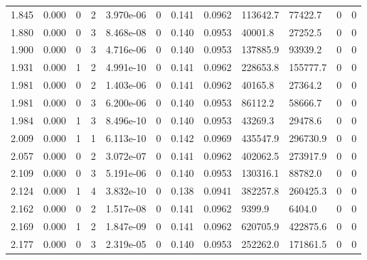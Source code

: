 \documentclass[preview]{standalone}
\begin{document}
{{{\begin{tabular}{L{1.2cm}C{1.2cm} C{0.3cm}C{0.5cm} C{1.4cm}C{1.4cm} C{1.4cm}C{1.4cm} C{1.6cm}C{1.6cm} C{1.6cm}C{1.6cm}}
  1.845  &  0.000  & 0     &  2 &  3.970e-06  & 0  &  0.141&   0.0962& 113642.7 & 77422.7   &  0 & 0  \\ 
  1.880  &  0.000  & 0     &  3 &  8.468e-08  & 0  &  0.140&   0.0953& 40001.8 & 27252.5   &  0 & 0  \\ 
  1.900  &  0.000  & 0     &  3 &  4.716e-06  & 0  &  0.140&   0.0953& 137885.9 & 93939.2   &  0 & 0  \\ 
  1.931  &  0.000  & 1     &  2 &  4.991e-10  & 0  &  0.141&   0.0962& 228653.8 & 155777.7   &  0 & 0  \\ 
  1.981  &  0.000  & 0     &  2 &  1.403e-06  & 0  &  0.141&   0.0962& 40165.8 & 27364.2   &  0 & 0  \\ 
  1.981  &  0.000  & 0     &  3 &  6.200e-06  & 0  &  0.140&   0.0953& 86112.2 & 58666.7   &  0 & 0  \\ 
  1.984  &  0.000  & 1     &  3 &  8.496e-10  & 0  &  0.140&   0.0953& 43269.3 & 29478.6   &  0 & 0  \\ 
  2.009  &  0.000  & 1     &  1 &  6.113e-10  & 0  &  0.142&   0.0969& 435547.9 & 296730.9   &  0 & 0  \\ 
  2.057  &  0.000  & 0     &  2 &  3.072e-07  & 0  &  0.141&   0.0962& 402062.5 & 273917.9   &  0 & 0  \\ 
  2.109  &  0.000  & 0     &  3 &  5.191e-06  & 0  &  0.140&   0.0953& 130316.1 & 88782.0   &  0 & 0  \\ 
  2.124  &  0.000  & 1     &  4 &  3.832e-10  & 0  &  0.138&   0.0941& 382257.8 & 260425.3   &  0 & 0  \\ 
  2.162  &  0.000  & 0     &  2 &  1.517e-08  & 0  &  0.141&   0.0962& 9399.9 & 6404.0   &  0 & 0  \\ 
  2.169  &  0.000  & 1     &  2 &  1.847e-09  & 0  &  0.141&   0.0962& 620705.9 & 422875.6   &  0 & 0  \\ 
  2.177  &  0.000  & 0     &  3 &  2.319e-05  & 0  &  0.140&   0.0953& 252262.0 & 171861.5   &  0 & 0  \\ 
\hline 
\end{tabular} 

}}}
\end{document}
